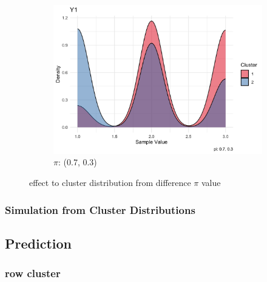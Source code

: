 \documentclass{article}
\begin{document}
\begin{figure}[h]
\begin{subfigure}{0.3\textwidth}
      \centering
      \includegraphics[width=\textwidth]{images/pi_07_03.png}
      \caption{$\pi$: (0.7, 0.3)}
  \end{subfigure}
  \caption{effect to cluster distribution from difference $\pi$ value}
  \label{fig:pi}
\end{figure}

\subsubsection{Simulation from Cluster Distributions}

\subsection{Prediction}

\subsubsection{row cluster}

\end{document}
